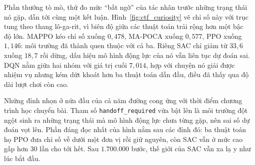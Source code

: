 \indent Phần thưởng tò mò, thứ đo mức ``bất ngờ'' của tác nhân trước những trạng thái nó gặp,
dẫn tới cùng một kết luận. Hình~\ref{fig:ctf_curiosity} vẽ chỉ số này với trục tung
theo thang lô-ga-rit, vì biên độ giữa các thuật toán trải rộng hơn một bậc độ lớn. MAPPO
kéo chỉ số xuống $0{,}478$, MA-POCA xuống $0{,}577$, PPO xuống $1{,}146$: môi trường đã
thành quen thuộc với cả ba. Riêng SAC chỉ giảm từ $33{,}6$ xuống $18{,}7$ rồi dừng, dấu
hiệu mô hình động lực của nó vẫn liên tục dự đoán sai. DQN nằm giữa hai nhóm với giá trị
cuối $7{,}014$, hợp với chuyện nó giải được nhiệm vụ nhưng kém dứt khoát hơn ba thuật toán dẫn
đầu, điều đã thấy qua độ dài lượt chơi còn cao.

\indent Những đỉnh nhọn ở nửa đầu của cả năm đường cong ứng với thời điểm chương trình học
chuyển bài. Tham số \texttt{handoff\_required} vừa bật lên là môi trường đột ngột sinh ra
những trạng thái mà mô hình động lực chưa từng gặp, nên sai số dự đoán vọt lên. Phần đáng
đọc nhất của hình nằm sau các đỉnh đó: ba thuật toán họ PPO đưa chỉ số về dưới một đơn vị
rồi giữ nguyên, còn SAC vẫn ở mức cao gấp hơn $30$ lần cho tới hết. Sau $1.700.000$ bước, thế
giới của SAC vẫn xa lạ y như lúc bắt đầu.

